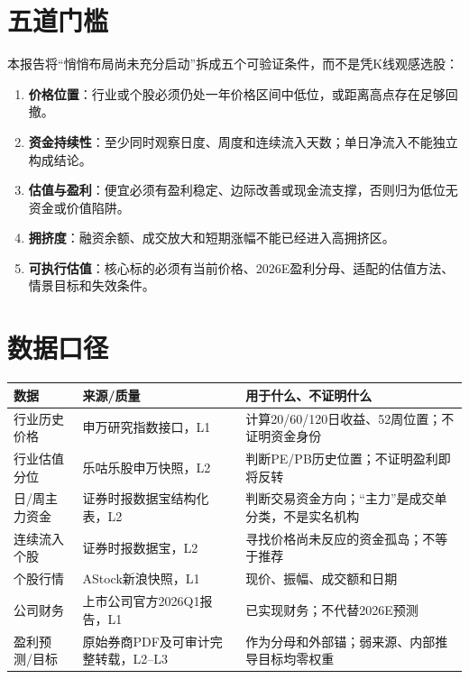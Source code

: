 \section{五道门槛}

本报告将“悄悄布局尚未充分启动”拆成五个可验证条件，而不是凭K线观感选股：

\begin{enumerate}
  \item \textbf{价格位置}：行业或个股必须仍处一年价格区间中低位，或距离高点存在足够回撤。
  \item \textbf{资金持续性}：至少同时观察日度、周度和连续流入天数；单日净流入不能独立构成结论。
  \item \textbf{估值与盈利}：便宜必须有盈利稳定、边际改善或现金流支撑，否则归为低位无资金或价值陷阱。
  \item \textbf{拥挤度}：融资余额、成交放大和短期涨幅不能已经进入高拥挤区。
  \item \textbf{可执行估值}：核心标的必须有当前价格、2026E盈利分母、适配的估值方法、情景目标和失效条件。
\end{enumerate}

\section{数据口径}

\begin{exhibitbox}
\begin{tabularx}{\textwidth}{L{3.2cm}L{3.1cm}X}
\toprule
\textbf{数据} & \textbf{来源/质量} & \textbf{用于什么、不证明什么} \\
\midrule
行业历史价格 & 申万研究指数接口，L1 & 计算20/60/120日收益、52周位置；不证明资金身份 \\
行业估值分位 & 乐咕乐股申万快照，L2 & 判断PE/PB历史位置；不证明盈利即将反转 \\
日/周主力资金 & 证券时报数据宝结构化表，L2 & 判断交易资金方向；“主力”是成交单分类，不是实名机构 \\
连续流入个股 & 证券时报数据宝，L2 & 寻找价格尚未反应的资金孤岛；不等于推荐 \\
个股行情 & AStock新浪快照，L1 & 现价、振幅、成交额和日期 \\
公司财务 & 上市公司官方2026Q1报告，L1 & 已实现财务；不代替2026E预测 \\
盈利预测/目标 & 原始券商PDF及可审计完整转载，L2--L3 & 作为分母和外部锚；弱来源、内部推导目标均零权重 \\
\bottomrule
\end{tabularx}
\end{exhibitbox}

